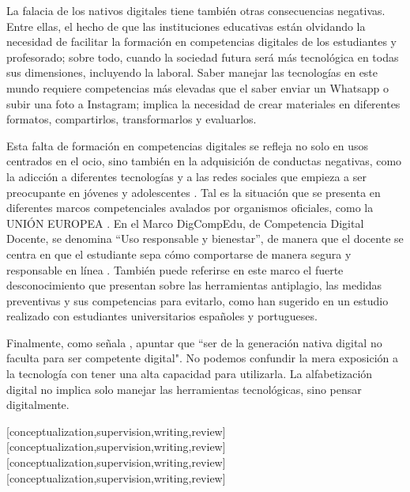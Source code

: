 \documentclass[spanish]{textolivre}
\begin{document}
La falacia de los nativos digitales tiene también otras consecuencias negativas. Entre ellas, el hecho de que las instituciones educativas están olvidando la necesidad de facilitar la formación en competencias digitales de los estudiantes y profesorado; sobre todo, cuando la sociedad futura será más tecnológica en todas sus dimensiones, incluyendo la laboral. Saber manejar las tecnologías en este mundo requiere competencias más elevadas que el saber enviar un Whatsapp o subir una foto a Instagram; implica la necesidad de crear materiales en diferentes formatos, compartirlos, transformarlos y evaluarlos.

Esta falta de formación en competencias digitales se refleja no solo en usos centrados en el ocio, sino también en la adquisición de conductas negativas, como la adicción a diferentes tecnologías y a las redes sociales que empieza a ser preocupante en jóvenes y adolescentes \cite{valencia_ortiz_use_2019, bernabeu_brotons_adicciones_2020, gonzalez-cortes_semana_2020, orosco_fabian_adolescentes_2020, ruiz-palmero_estudio_2021}. Tal es la situación que se presenta en diferentes marcos competenciales avalados por organismos oficiales, como la UNIÓN EUROPEA \cite{cabero-almenara_evaluation_2020}. En el Marco DigCompEdu, de Competencia Digital Docente, se denomina “Uso responsable y bienestar”, de manera que el docente se centra en que el estudiante sepa cómo comportarse de manera segura y responsable en línea \cite{cabero-almenara_marco_2020}. También puede referirse en este marco el fuerte desconocimiento que presentan sobre las herramientas antiplagio, las medidas preventivas y sus competencias para evitarlo, como han sugerido \textcite{cebrian-robles_conocimiento_2020} en un estudio realizado con estudiantes universitarios españoles y portugueses. 

Finalmente, como señala \textcite[p. 33]{granado_palma_educacion_2019}, apuntar que “ser de la generación nativa digital no faculta para ser competente digital". No podemos confundir la mera exposición a la tecnología con tener una alta capacidad para utilizarla. La alfabetización digital no implica solo manejar las herramientas tecnológicas, sino pensar digitalmente.



\printbibliography\label{sec-bib}


\begin{contributors}
[conceptualization,supervision,writing,review]
[conceptualization,supervision,writing,review]
[conceptualization,supervision,writing,review]
[conceptualization,supervision,writing,review]
\end{contributors}
\end{document}

